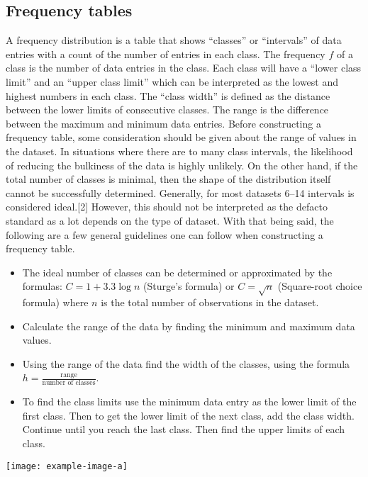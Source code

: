 
\subsection{Frequency tables}
A frequency distribution is a table that shows “classes” or “intervals” of data 
entries with a count of the number of entries in each class. The frequency $f$ of 
a class is the number of data entries in the class. Each class will have a 
“lower class limit” and an “upper class limit” which can be interpreted as the 
lowest and highest numbers in each class. The “class width” is defined as the 
distance between the lower limits of consecutive classes. The range is the difference 
between the maximum and minimum data entries. Before constructing a frequency table, 
some consideration should be given about the range of values in the dataset. In 
situations where there are to many class intervals, the likelihood of reducing the 
bulkiness of the data is highly unlikely. On the other hand, if the total number 
of classes is minimal, then the shape of the distribution itself cannot be successfully 
determined. Generally, for most datasets 6–14 intervals is considered ideal.[2] However, 
this should not be interpreted as the defacto standard as a lot depends on the 
type of dataset. With that being said, the following are a few general guidelines 
one can follow when constructing a frequency table. 

\begin{itemize}
    \item The ideal number of classes can be determined or approximated by the 
    formulas: $C = 1 + 3.3\log{n}$ (Sturge's formula) or $C = \sqrt{n}$ 
    (Square-root choice formula) where $n$ is the total number of observations in 
    the dataset. 
    \item Calculate the range of the data by finding the minimum and maximum data 
    values. 
    \item  Using the range of the data find the width of the classes, using the
    formula $h = \frac{\mbox{range}}{\mbox{number of classes}}$.
    \item To find the class limits use the minimum data entry as the lower limit 
    of the first class. Then to get the lower limit of the next class, add the 
    class width. Continue until you reach the last class. Then find the upper 
    limits of each class.
\end{itemize}

\texttt{[image: example-image-a]} 

